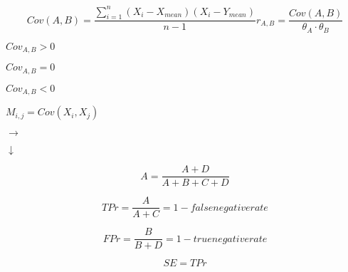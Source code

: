 \documentclass[10pt]{book}
\begin{document}
\begin{mdSnippets}
\begin{mdDisplaySnippet}
\[%
Cov(A,B) = \frac{\sum_{i=1}^n (X_i - X_{mean})(X_i - Y_{mean})}{n - 1}
r_{A,B} = \frac{Cov(A,B)}{\theta_A \cdot \theta_B}
\]%
\end{mdDisplaySnippet}%
\begin{mdInlineSnippet}[fce83cb02a2dc0be2e78f898f2859411]%
$Cov_{A, B} > 0$\end{mdInlineSnippet}%
\begin{mdInlineSnippet}%
$Cov_{A, B} = 0$\end{mdInlineSnippet}%
\begin{mdInlineSnippet}[7e88034e872fce6d1d2bd902a882a0df]%
$Cov_{A, B} < 0$\end{mdInlineSnippet}%
\begin{mdInlineSnippet}[ab74442f4873888a9501dff0ec96ac61]%
$M_{i,j} = Cov(X_i, X_j)$\end{mdInlineSnippet}%
\begin{mdInlineSnippet}[0a183ed5142c1166275da8fb1cbbd43f]%
$\rightarrow$\end{mdInlineSnippet}%
\begin{mdInlineSnippet}[42ae4615838c20bda1769756b7078922]%
$\downarrow$\end{mdInlineSnippet}%
\begin{mdDisplaySnippet}%
\[%
  A = \frac{A+D}{A+B+C+D}
\]%
\end{mdDisplaySnippet}%
\begin{mdDisplaySnippet}%
\[%
  TPr = \frac{A}{A+C} = 1 - false negative rate
\]%
\end{mdDisplaySnippet}%
\begin{mdDisplaySnippet}[1a30e46ff79f03c56b8e98cb9ca6c59d]%
\[%
  FPr = \frac{B}{B+D} = 1 - true negative rate
\]%
\end{mdDisplaySnippet}%
\begin{mdDisplaySnippet}[2e81f3d8720b764e16a9f1f4b4a4cc02]%
\[%
  SE = TPr
\]%
\end{mdDisplaySnippet}%
\begin{mdDisplaySnippet}%
\[%
\]
\end{mdDisplaySnippet}
\end{mdSnippets}
\end{document}
